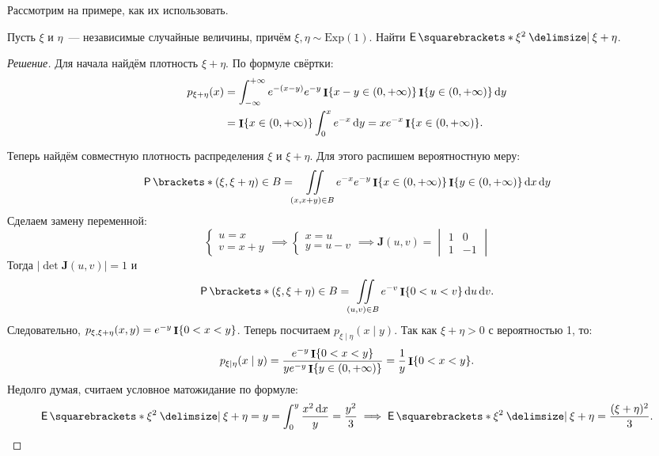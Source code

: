 Рассмотрим на примере, как их использовать.
\begin{problem}
	Пусть \(\xi\) и \(\eta\)~--- независимые случайные величины, причём \(\xi, \eta \sim \mathrm{Exp}(1)\). Найти \(\E{\xi^2 \given \xi + \eta}\).
\end{problem}
\begin{proof}[Решение]
	Для начала найдём плотность \(\xi + \eta\). По формуле свёртки:
	\begin{align*}
		p_{\xi + \eta}(x) &= \int_{-\infty}^{+\infty} e^{-(x - y)}e^{-y}\mathop{\mathbf{I}}\{x - y \in (0, +\infty)\}\mathop{\mathbf{I}}\{y \in (0, +\infty)\}\mathop{}\!\mathrm{d} y \\
		&= \mathop{\mathbf{I}}\{x \in (0, +\infty)\} \int_{0}^{x} e^{-x}\mathop{}\!\mathrm{d} y = xe^{-x}\mathop{\mathbf{I}}\{x \in (0, +\infty)\}.
	\end{align*}
	
	Теперь найдём совместную плотность распределения \(\xi\) и \(\xi + \eta\). Для этого распишем вероятностную меру:
	\[
		\Pr{(\xi, \xi + \eta) \in B} = \iint\limits_{(x, x + y) \in B} e^{-x}e^{-y}\I\{x \in (0, +\infty)\}\I\{y \in (0, +\infty)\}\diff x \diff y
	\]
	Сделаем замену переменной:
	\[
		\begin{cases}
			u = x \\
			v = x + y
		\end{cases}
		\implies
		\begin{cases}
			x = u \\
			y = u - v
		\end{cases}
		\implies
		\mathbf{J}(u, v) = 
		\begin{vmatrix}
		1 & 0 \\
		1 & -1
		\end{vmatrix}
	\]
	Тогда \(|\det\mathbf{J}(u, v)| = 1\) и
	\[
		\Pr{(\xi, \xi + \eta) \in B} = \iint\limits_{(u, v) \in B} e^{-v}\I\{0 < u < v\}\diff u \diff v.
	\]
	Следовательно, \(p_{\xi, \xi + \eta}(x, y) = e^{-y}\mathop{\mathbf{I}}\{0 < x < y\}\). Теперь посчитаем \(p_{\xi \mid \eta}(x \mid y)\). Так как \(\xi + \eta > 0\) с вероятностью 1, то:
	\[
		p_{\xi \mid \eta}(x \mid y) = \dfrac{e^{-y}\mathop{\mathbf{I}}\{0 < x < y\}}{ye^{-y}\mathop{\mathbf{I}}\{y \in (0, +\infty)\}} = \frac{1}{y}\mathop{\mathbf{I}}\{0 < x < y\}.
	\]
	Недолго думая, считаем условное матожидание по формуле:
	\[
		\E{\xi^2 \given \xi + \eta = y} = \int_{0}^{y}\frac{x^2\diff x}{y} = \frac{y^2}{3} \implies \E{\xi^2 \given \xi + \eta} = \frac{(\xi + \eta)^2}{3}.
	\]
\end{proof}
